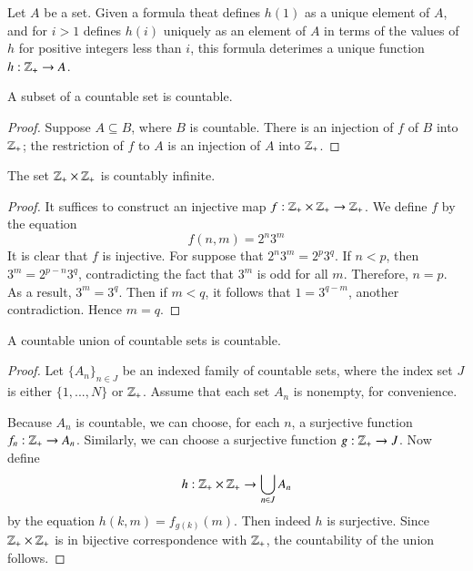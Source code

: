 \documentclass[12pt, a4paper, oneside, openright, titlepage]{book}
\begin{document}
\begin{appendices}
    \begin{definition}
        Let $A$ be a set. Given a formula theat defines $h(1)$ as a unique element of $A$, and for $i > 1$ defines $h(i)$ uniquely as an element of $A$ in terms of the values of $h$ for positive integers less than $i$, this formula deterimes a unique function $h:\mathbb Z_+\rightarrow A$.
    \end{definition}


    \begin{corollary}
        A subset of a countable set is countable.
    \end{corollary}
    \begin{proof}
        Suppose $A \subseteq B$, where $B$ is countable. There is an injection of $f$ of $B$ into $\mathbb Z_+$; the restriction of $f$ to $A$ is an injection of $A$ into $\mathbb Z_+$.
    \end{proof}


    \begin{corollary}
        The set $\mathbb Z_+\times \mathbb Z_+$ is countably infinite.
    \end{corollary}
    \begin{proof}
        It suffices to construct an injective map $f:\mathbb Z_+\times \mathbb Z_+\rightarrow \mathbb Z_+$. We define $f$ by the equation $$f(n,m) = 2^n3^m$$ It is clear that $f$ is injective. For suppose that $2^n3^m = 2^p3^q$. If $n < p$, then $3^m = 2^{p-n}3^q$, contradicting the fact that $3^m$ is odd for all $m$. Therefore, $n = p$. As a result, $3^m = 3^q$. Then if $m < q$, it follows that $1 = 3^{q-m}$, another contradiction. Hence $m = q$.
    \end{proof}


    \begin{theorem}
        A countable union of countable sets is countable.
    \end{theorem}
    \begin{proof}
        Let $\{A_n\}_{n\in J}$ be an indexed family of countable sets, where the index set $J$ is either $\{1,...,N\}$ or $\mathbb Z_+$. Assume that each set $A_n$ is nonempty, for convenience.

        Because $A_n$ is countable, we can choose, for each $n$, a surjective function $f_n:\mathbb Z_+\rightarrow A_n$. Similarly, we can choose a surjective function $g:\mathbb Z_+\rightarrow J$. Now define \begin{equation*}
            h:\mathbb Z_+\times \mathbb Z_+\rightarrow \bigcup\limits_{n\in J}A_n
        \end{equation*}
        by the equation $h(k,m) = f_{g(k)}(m)$. Then indeed $h$ is surjective. Since $\mathbb Z_+\times\mathbb Z_+$ is in bijective correspondence with $\mathbb Z_+$, the countability of the union follows.
    \end{proof}


\end{appendices}
\end{document}
